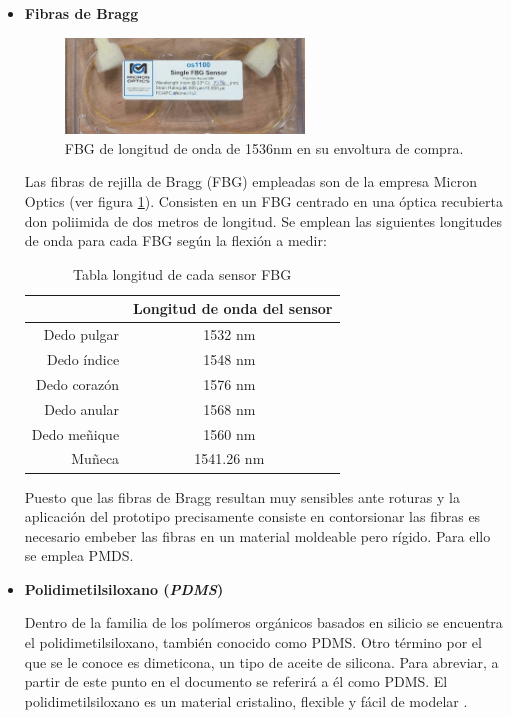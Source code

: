 \begin{itemize}


\item \textbf{Fibras de Bragg}
\begin{figure}[H]
	\centering
	\includegraphics[width=0.60\textwidth]{./img/fibraBraggpaquete2}
	\caption{FBG de longitud de onda de 1536nm en su envoltura de compra.} \label{fig:FBGpaquete}
\end{figure}

Las fibras de rejilla de Bragg (FBG) empleadas son de la empresa Micron Optics (ver figura \ref{fig:FBGpaquete}). Consisten en un FBG centrado en una óptica recubierta don poliimida de dos metros de longitud. Se emplean las siguientes longitudes de onda para cada FBG según la flexión a medir:

\begin{table}[H]
	\centering
	\begin{tabular}[t]{|r|c|}
		\hline
		& Longitud de onda del sensor\\
		\hline
		\hline
		Dedo pulgar & 1532 nm \\
		\hline
		Dedo índice & 1548 nm \\
		\hline
		Dedo corazón & 1576 nm \\
		\hline
		Dedo anular & 1568 nm \\
		\hline
		Dedo meñique & 1560 nm \\
		\hline
		Muñeca & 1541.26 nm \\
		\hline
	\end{tabular}
	\caption{Tabla longitud de cada sensor FBG}
	\label{tabla:mmedidas 80 cm}
\end{table}

Puesto que las fibras de Bragg resultan muy sensibles ante roturas y la aplicación del prototipo precisamente consiste en contorsionar las fibras es necesario embeber las fibras en un material moldeable pero rígido. Para ello se emplea PMDS.


	\item \textbf{Polidimetilsiloxano (\textit{PDMS})}
	
	Dentro de la familia de los polímeros orgánicos basados en silicio se encuentra el polidimetilsiloxano, también conocido como PDMS. Otro término por el que se le conoce es dimeticona, un tipo de aceite de silicona. Para abreviar, a partir de este punto en el documento se referirá a él como PDMS. El polidimetilsiloxano es un material cristalino, flexible y fácil de modelar \cite{propPDMS}.
	

\end{itemize}
